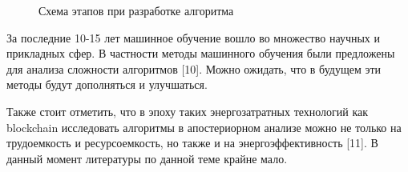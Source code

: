 \begin{figure}[h!]
\caption{Схема этапов при разработке алгоритма}
\label{ris:image1}
\end{figure}

За последние 10-15 лет машинное обучение вошло во множество научных и прикладных сфер. В частности методы машинного обучения были предложены для анализа сложности алгоритмов [10]. Можно ожидать, что в будущем эти методы будут дополняться и улучшаться.

Также стоит отметить, что в эпоху таких энергозатратных технологий как blockchain исследовать алгоритмы в апостериорном анализе можно не только на трудоемкость и ресурсоемкость, но также и на энергоэффективность [11]. В данный момент литературы по данной теме крайне мало.

\pagebreak